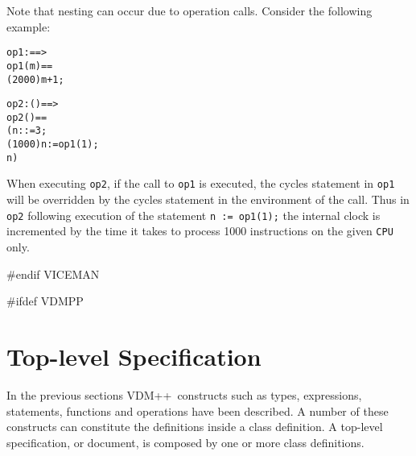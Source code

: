 \documentclass[\pformat,12pt]{article}
\newcommand{\vdmpp}{VDM++}
\begin{document}
\begin{description}
Note that nesting can occur due to operation calls. Consider the
following example:
\begin{alltt}
      op1 :  ==> 
      op1(m) ==
        (2000)  m + 1;

      op2 : () ==> 
      op2() ==
      ( n :  := 3;
       (1000)  n := op1(1);
        n) 
\end{alltt}
When executing \texttt{op2}, if the call to \texttt{op1} is
executed, the cycles statement in \texttt{op1} will be overridden by
the cycles statement in the environment of the call. Thus in
\texttt{op2} following execution of the statement 
\texttt{n := op1(1);} the internal clock is incremented by the time
it takes to process 1000 instructions on the given \texttt{CPU}
only. 
\end{description}

#endif VICEMAN

#ifdef VDMPP
%
%


%

\newpage
\section{Top-level Specification}

In the previous sections \vdmpp\ constructs such as types,
expressions, statements, functions and operations have been
described. A number of these constructs can constitute the definitions
inside a class definition. A top-level specification, or document, is
composed by one or more class definitions.
\end{document}
